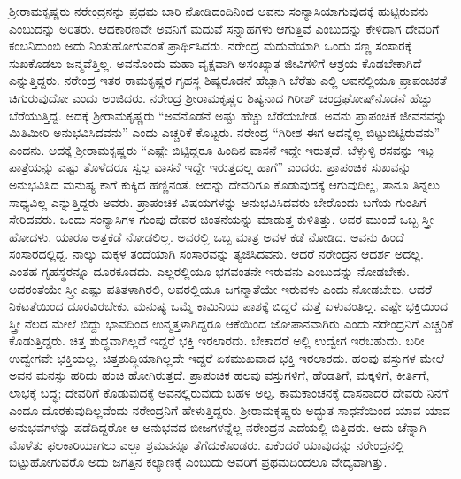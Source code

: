 \vskip 2pt

ಶ‍್ರೀರಾಮಕೃಷ್ಣರು ನರೇಂದ್ರನನ್ನು ಪ್ರಥಮ ಬಾರಿ ನೋಡಿದಂದಿನಿಂದ ಅವನು ಸಂನ್ಯಾಸಿಯಾಗುವುದಕ್ಕೆ ಹುಟ್ಟಿರುವನು ಎಂಬುದನ್ನು ಅರಿತರು. ಆದಕಾರಣವೇ ಅವನಿಗೆ ಮದುವೆ ಸನ್ನಾಹಗಳು ಆಗುತ್ತಿವೆ ಎಂಬುದನ್ನು ಕೇಳಿದಾಗ ದೇವರಿಗೆ ಕಂಬನಿದುಂಬಿ ಅದು ನಿಂತುಹೋಗುವಂತೆ ಪ್ರಾರ್ಥಿಸಿದರು. ನರೇಂದ್ರ ಮದುವೆಯಾಗಿ ಒಂದು ಸಣ್ಣ ಸಂಸಾರಕ್ಕೆ ಸುಖಕೊಡಲು ಜನ್ಮವೆತ್ತಿಲ್ಲ. ಅವನೊಂದು ಮಹಾ ವೃಕ್ಷವಾಗಿ ಅಸಂಖ್ಯಾತ ಜೀವಿಗಳಿಗೆ ಆಶ್ರಯ ಕೊಡಬೇಕಾಗಿದೆ ಎನ್ನುತ್ತಿದ್ದರು. ನರೇಂದ್ರ ಇತರ ರಾಮಕೃಷ್ಣರ ಗೃಹಸ್ಥ ಶಿಷ್ಯರೊಡನೆ ಹೆಚ್ಚಾಗಿ ಬೆರೆತು ಎಲ್ಲಿ ಅವನಲ್ಲಿಯೂ ಪ್ರಾಪಂಚಿಕತೆ ಚಿಗುರುವುದೋ ಎಂದು ಅಂಜಿದರು. ನರೇಂದ್ರ ಶ‍್ರೀರಾಮಕೃಷ್ಣರ ಶಿಷ್ಯನಾದ ಗಿರೀಶ್ ಚಂದ್ರಘೋಷ್‍ನೊಡನೆ ಹೆಚ್ಚು ಬೆರೆಯುತ್ತಿದ್ದ. ಅದಕ್ಕೆ ಶ‍್ರೀರಾಮಕೃಷ್ಣರು “ಅವನೊಡನೆ ಅಷ್ಟು ಹೆಚ್ಚು ಬೆರೆಯಬೇಡ. ಅವನು ಪ್ರಾಪಂಚಿಕ ಜೀವನವನ್ನು ಮಿತಿಮೀರಿ ಅನುಭವಿಸಿದವನು” ಎಂದು ಎಚ್ಚರಿಕೆ ಕೊಟ್ಟರು. ನರೇಂದ್ರ “ಗಿರೀಶ ಈಗ ಅದನ್ನೆಲ್ಲ ಬಿಟ್ಟುಬಿಟ್ಟಿರುವನು” ಎಂದನು. ಅದಕ್ಕೆ ಶ‍್ರೀರಾಮಕೃಷ್ಣರು “ಎಷ್ಟೇ ಬಿಟ್ಟಿದ್ದರೂ ಹಿಂದಿನ ವಾಸನೆ ಇದ್ದೇ ಇರುತ್ತದೆ. ಬೆಳ್ಳುಳ್ಳಿ ರಸವನ್ನು ಇಟ್ಟ ಪಾತ್ರೆಯನ್ನು ಎಷ್ಟು ತೊಳೆದರೂ ಸ್ವಲ್ಪ ವಾಸನೆ ಇದ್ದೇ ಇರುತ್ತದಲ್ಲ ಹಾಗೆ” ಎಂದರು. ಪ್ರಾಪಂಚಿಕ ಸುಖವನ್ನು ಅನುಭವಿಸಿದ ಮನುಷ್ಯ ಕಾಗೆ ಕುಕ್ಕಿದ ಹಣ್ಣಿನಂತೆ. ಅದನ್ನು ದೇವರಿಗೂ ಕೊಡುವುದಕ್ಕೆ ಆಗುವುದಿಲ್ಲ, ತಾನೂ ತಿನ್ನಲು ಸಾಧ್ಯವಿಲ್ಲ ಎನ್ನುತ್ತಿದ್ದರು ಅವರು. ಪ್ರಾಪಂಚಿಕ ವಿಷಯಗಳನ್ನು ಅನುಭವಿಸಿದವರು ಬೇರೊಂದು ಬಗೆಯ ಗುಂಪಿಗೆ ಸೇರಿದವರು. ಒಂದು ಸಂನ್ಯಾಸಿಗಳ ಗುಂಪು ದೇವರ ಚಿಂತನೆಯನ್ನು ಮಾಡುತ್ತ ಕುಳಿತಿತ್ತು. ಅವರ ಮುಂದೆ ಒಬ್ಬ ಸ್ತ್ರೀ ಹೋದಳು. ಯಾರೂ ಅತ್ತಕಡೆ ನೋಡಲಿಲ್ಲ. ಅವರಲ್ಲಿ ಒಬ್ಬ ಮಾತ್ರ ಅವಳ ಕಡೆ ನೋಡಿದ. ಅವನು ಹಿಂದೆ ಸಂಸಾರದಲ್ಲಿದ್ದ. ನಾಲ್ಕು ಮಕ್ಕಳ ತಂದೆಯಾಗಿ ಸಂಸಾರವನ್ನು ತ್ಯಜಿಸಿದವನು. ಆದರೆ ನರೇಂದ್ರನ ಆದರ್ಶ ಅದಲ್ಲ. ಎಂತಹ ಗೃಹಸ್ಥರನ್ನೂ ದೂರಕೂಡದು. ಎಲ್ಲರಲ್ಲಿಯೂ ಭಗವಂತನೇ ಇರುವನು ಎಂಬುದನ್ನು ನೋಡಬೇಕು. ಅದರಂತೆಯೇ ಸ್ತ್ರೀ ಎಷ್ಟು ಪತಿತಳಾಗಿರಲಿ, ಅವರಲ್ಲಿಯೂ ಜಗನ್ಮಾತೆಯೇ ಇರುವಳು ಎಂದು ನೋಡಬೇಕು. ಆದರೆ ನಿಕಟತೆಯಿಂದ ದೂರವಿರಬೇಕು. ಮನುಷ್ಯ ಒಮ್ಮೆ ಕಾಮಿನಿಯ ಪಾಶಕ್ಕೆ ಬಿದ್ದರೆ ಮತ್ತೆ ಏಳುವಂತಿಲ್ಲ. ಎಷ್ಟೇ ಭಕ್ತಿಯಿಂದ ಸ್ತ್ರೀ ನೆಲದ ಮೇಲೆ ಬಿದ್ದು ಭಾವದಿಂದ ಉನ್ಮತ್ತಳಾಗಿದ್ದರೂ ಆಕೆಯಿಂದ ಜೋಪಾನವಾಗಿರು ಎಂದು ನರೇಂದ್ರನಿಗೆ ಎಚ್ಚರಿಕೆ ಕೊಡುತ್ತಿದ್ದರು. ಚಿತ್ತ ಶುದ್ಧವಾಗಿಲ್ಲದೆ ಇದ್ದರೆ ಭಕ್ತಿ ಇರಲಾರದು. ಬೇಕಾದರೆ ಅಲ್ಲಿ ಉದ್ವೇಗ ಇರಬಹುದು. ಬರೀ ಉದ್ವೇಗವೇ ಭಕ್ತಿಯಲ್ಲ. ಚಿತ್ತಶುದ್ಧಿಯಾಗಿಲ್ಲದೇ ಇದ್ದರೆ ಏಕಮುಖವಾದ ಭಕ್ತಿ ಇರಲಾರದು. ಹಲವು ವಸ್ತುಗಳ ಮೇಲೆ ಅವನ ಮನಸ್ಸು ಹರಿದು ಹಂಚಿ ಹೋಗಿರುತ್ತದೆ. ಪ್ರಾಪಂಚಿಕ ಹಲವು ವಸ್ತುಗಳಿಗೆ, ಹೆಂಡತಿಗೆ, ಮಕ್ಕಳಿಗೆ, ಕೀರ್ತಿಗೆ, ಲಾಭಕ್ಕೆ ಬದ್ಧ; ದೇವರಿಗೆ ಕೊಡುವುದಕ್ಕೆ ಅವನಲ್ಲಿರುವುದು ಬಹಳ ಅಲ್ಪ. ಕಾಮಕಾಂಚನಕ್ಕೆ ದಾಸನಾದರೆ ದೇವರು ನಿನಗೆ ಎಂದೂ ದೊರಕುವುದಿಲ್ಲವೆಂದು ನರೇಂದ್ರನಿಗೆ ಹೇಳುತ್ತಿದ್ದರು. ಶ‍್ರೀರಾಮಕೃಷ್ಣರು ಅದ್ಭುತ ಸಾಧನೆಯಿಂದ ಯಾವ ಯಾವ ಅನುಭವಗಳನ್ನು ಪಡೆದಿದ್ದರೋ ಆ ಅನುಭವದ ಬೀಜಗಳನ್ನೆಲ್ಲ ನರೇಂದ್ರನ ಎದೆಯಲ್ಲಿ ಬಿತ್ತಿದರು. ಅದು ಚೆನ್ನಾಗಿ ಮೊಳೆತು ಫಲಕಾರಿಯಾಗಲು ಎಲ್ಲಾ ಶ್ರಮವನ್ನೂ ತೆಗೆದುಕೊಂಡರು. ಏಕೆಂದರೆ ಯಾವುದನ್ನು ನರೇಂದ್ರನಲ್ಲಿ ಬಿಟ್ಟುಹೋಗುವರೊ ಅದು ಜಗತ್ತಿನ ಕಲ್ಯಾಣಕ್ಕೆ ಎಂಬುದು ಅವರಿಗೆ ಪ್ರಥಮದಿಂದಲೂ ವೇದ್ಯವಾಗಿತ್ತು.

